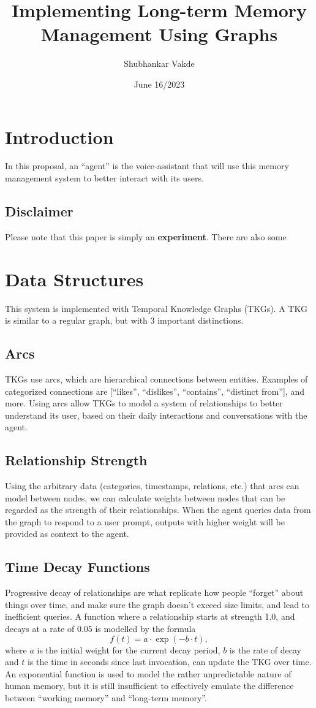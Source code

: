 \documentclass{article}
\title{Implementing Long-term Memory Management Using Graphs}
\author{Shubhankar Vakde}
\date{June 16/2023}
\begin{document}
\maketitle

\section{Introduction}
In this proposal, an ``agent'' is the voice-assistant that will use this memory management system to better interact with its users.

\subsection{Disclaimer}
Please note that this paper is simply an \textbf{experiment}. There are also some

\section{Data Structures}
This system is implemented with Temporal Knowledge Graphs (TKGs). A TKG is similar to a regular graph, but with 3 important distinctions.

\subsection{Arcs}
TKGs use arcs, which are hierarchical connections between entities. Examples of categorized connections are [``likes'', ``dislikes'', ``contains'', ``distinct from''], and more. Using arcs allow TKGs to model a system of relationships to better understand its user, based on their daily interactions and conversations with the agent.

\subsection{Relationship Strength}
Using the arbitrary data (categories, timestamps, relations, etc.) that arcs can model between nodes, we can calculate weights between nodes that can be regarded as the strength of their relationships. When the agent queries data from the graph to respond to a user prompt, outputs with higher weight will be provided as context to the agent.

\subsection{Time Decay Functions}
Progressive decay of relationships are what replicate how people ``forget'' about things over time, and make sure the graph doesn't exceed size limits, and lead to inefficient queries. A function where a relationship starts at strength 1.0, and decays at a rate of 0.05 is modelled by the formula
\[ f(t) = a \cdot \exp(-b \cdot t), \]
where $a$ is the initial weight for the current decay period, $b$ is the rate of decay and $t$ is the time in seconds since last invocation, can update the TKG over time. An exponential function is used to model the rather unpredictable nature of human memory, but it is still insufficient to effectively emulate the difference between ``working memory'' and ``long-term memory''.
\end{document}

